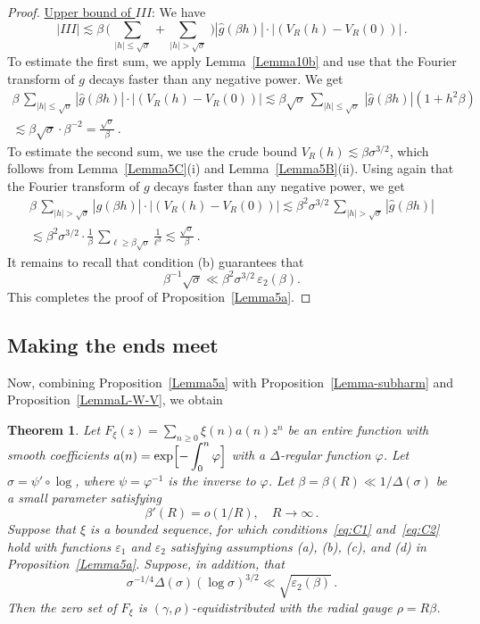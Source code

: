 \documentclass[11pt]{amsart}
\numberwithin{equation}{section}
\newtheorem{theorem}{Theorem}
\def\ep{{\varepsilon}}
\begin{document}
\begin{proof}
\medskip\noindent\underline{Upper bound of $III$}:
We have
\[
| III | \lesssim \beta\, \bigl(\, \sum_{|h|\le\sqrt\sigma} + \sum_{|h|>\sqrt{\sigma}} \,\bigr)
|\widehat{g}(\beta h)|\cdot |(V_R(h) - V_R(0))|\,.
\]
To estimate the first sum, we apply Lemma~\ref{Lemma10b} and use that the Fourier transform of $g$ decays faster than any negative power. We get
\begin{multline*}
\beta\, \sum_{|h|\le\sqrt\sigma}
|\widehat{g}(\beta h)|\cdot |(V_R(h) - V_R(0))| \lesssim \beta\sqrt{\sigma}\,
\sum_{|h|\le\sqrt\sigma}\,  |\widehat{g}(\beta h)| (1+ h^2\beta) \\
\lesssim \beta\sqrt{\sigma} \cdot \beta^{-2} = \frac{\sqrt{\sigma}}\beta\,.
\end{multline*}
To estimate the second sum, we use the crude bound $V_R(h) \lesssim \beta\sigma^{3/2}$,
which follows from Lemma~\ref{Lemma5C}(i) and Lemma~\ref{Lemma5B}(ii).
Using again that the Fourier transform of $g$ decays faster than any negative power, we get
\begin{multline*}
\beta\, \sum_{|h|>\sqrt\sigma}
|\widehat{g}(\beta h)|\cdot |(V_R(h) - V_R(0))| \lesssim \beta^2\sigma^{3/2}\,
\sum_{|h|>\sqrt\sigma} |\widehat{g}(\beta h)| \\
\lesssim \beta^2 \sigma^{3/2} \cdot \frac1{\beta}\,
\sum_{\ell\ge\beta\sqrt\sigma} \frac1{\ell^3} \lesssim \frac{\sqrt{\sigma}}\beta\,.
\end{multline*}
It remains to recall that
condition (b) guarantees that 
$$
\beta^{-1}\sqrt{\sigma} \ll \beta^2 \sigma^{3/2}\, \ep_2(\beta).
$$
This completes the proof of Proposition~\ref{Lemma5a}.
\end{proof}

\subsection{Making the ends meet}

Now, combining Proposition~\ref{Lemma5a} with Proposition~\ref{Lemma-subharm} and Proposition~\ref{LemmaL-W-V},
we obtain

\begin{theorem}\label{thm:main2}
Let $F_\xi (z) = \displaystyle \sum_{n\ge 0} \xi(n)a(n) z^n$ be an entire function with smooth
coefficients $a(n) = \displaystyle \exp\Bigl[ -\int_0^n \varphi \Bigr]$ with a $\Delta$-regular
function $\varphi$. Let $\sigma = \psi'\circ\log$, where $\psi=\varphi^{-1}$ is the inverse to
$\varphi$. Let $\beta=\beta(R) \ll 1/\Delta(\sigma)$ be a small parameter satisfying
\[
\beta' (R) = o(1/R), \quad R\to\infty\,.
\]
Suppose that $\xi$ is a bounded sequence, for which
conditions~\eqref{eq:C1} and~\eqref{eq:C2} hold with functions $\ep_1$ and $\ep_2$
satisfying assumptions (a), (b), (c), and (d) in Proposition~\ref{Lemma5a}. Suppose, in addition,
that
\begin{equation}\label{eq:additional}
\sigma^{-1/4}\Delta(\sigma)(\log\sigma)^{3/2} \ll \sqrt{\ep_2(\beta)}\,.
\end{equation}
Then the zero set of $F_\xi$ is $(\gamma, \rho)$-equidistributed with the radial gauge $\rho = R\beta$.
\end{theorem}
\end{document}
